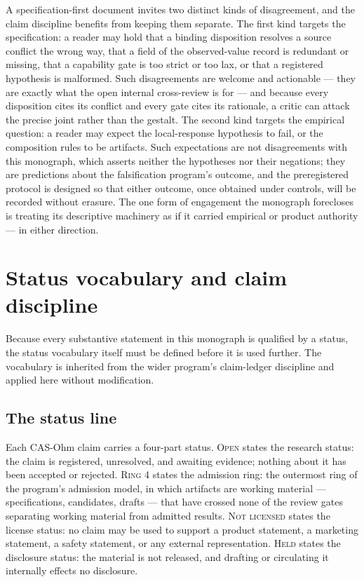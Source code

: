 A specification-first document invites two distinct kinds of disagreement, and the claim discipline benefits from keeping them separate. The first kind targets the specification: a reader may hold that a binding disposition resolves a source conflict the wrong way, that a field of the observed-value record is redundant or missing, that a capability gate is too strict or too lax, or that a registered hypothesis is malformed. Such disagreements are welcome and actionable --- they are exactly what the open internal cross-review is for --- and because every disposition cites its conflict and every gate cites its rationale, a critic can attack the precise joint rather than the gestalt. The second kind targets the empirical question: a reader may expect the local-response hypothesis to fail, or the composition rules to be artifacts. Such expectations are not disagreements with this monograph, which asserts neither the hypotheses nor their negations; they are predictions about the falsification program's outcome, and the preregistered protocol is designed so that either outcome, once obtained under controls, will be recorded without erasure. The one form of engagement the monograph forecloses is treating its descriptive machinery as if it carried empirical or product authority --- in either direction.

\section{Status vocabulary and claim discipline}\label{ch01:status}

Because every substantive statement in this monograph is qualified by a status, the status vocabulary itself must be defined before it is used further. The vocabulary is inherited from the wider program's claim-ledger discipline and applied here without modification.

\subsection{The status line}\label{ch01:status:line}

Each CAS-Ohm claim carries a four-part status. \textsc{Open} states the research status: the claim is registered, unresolved, and awaiting evidence; nothing about it has been accepted or rejected. \textsc{Ring 4} states the admission ring: the outermost ring of the program's admission model, in which artifacts are working material --- specifications, candidates, drafts --- that have crossed none of the review gates separating working material from admitted results. \textsc{Not licensed} states the license status: no claim may be used to support a product statement, a marketing statement, a safety statement, or any external representation. \textsc{Held} states the disclosure status: the material is not released, and drafting or circulating it internally effects no disclosure.

